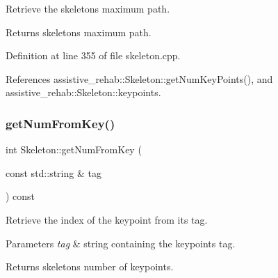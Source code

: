 Retrieve the skeleton\textquotesingle{}s maximum path. 

\begin{DoxyReturn}{Returns}
skeleton\textquotesingle{}s maximum path. 
\end{DoxyReturn}


Definition at line 355 of file skeleton.\+cpp.


\begin{DoxyCode}{0}

\end{DoxyCode}


References assistive\+\_\+rehab\+::\+Skeleton\+::get\+Num\+Key\+Points(), and assistive\+\_\+rehab\+::\+Skeleton\+::keypoints.

\mbox{\label{classassistive__rehab_1_1Skeleton_a954bfa99e0dad997ca6d93495246d3f1}} 
\subsubsection{\texorpdfstring{getNumFromKey()}{getNumFromKey()}}
{\footnotesize\ttfamily int Skeleton\+::get\+Num\+From\+Key (\begin{DoxyParamCaption}\item[{const std\+::string \&}]{tag }\end{DoxyParamCaption}) const\hspace{0.3cm}{\ttfamily [inherited]}}



Retrieve the index of the keypoint from its tag. 


\begin{DoxyParams}{Parameters}
{\em tag} & string containing the keypoint\textquotesingle{}s tag. \\
\hline
\end{DoxyParams}
\begin{DoxyReturn}{Returns}
skeleton\textquotesingle{}s number of keypoints. 
\end{DoxyReturn}


